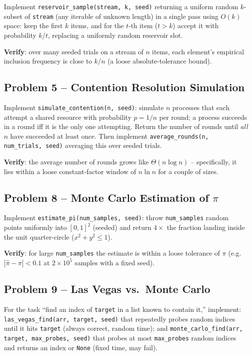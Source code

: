 \documentclass[11pt]{article}
\begin{document}
Implement \texttt{reservoir\_sample(stream, k, seed)} returning a uniform random $k$-subset
of \texttt{stream} (any iterable of unknown length) in a single pass using $O(k)$ space:
keep the first $k$ items, and for the $t$-th item ($t>k$) accept it with probability $k/t$,
replacing a uniformly random reservoir slot.

\textbf{Verify}: over many seeded trials on a stream of $n$ items, each element's empirical
inclusion frequency is close to $k/n$ (a loose absolute-tolerance bound).

\subsection*{Problem 5 -- Contention Resolution Simulation}

Implement \texttt{simulate\_contention(n, seed)}: simulate $n$ processes that each attempt a
shared resource with probability $p = 1/n$ per round; a process succeeds in a round iff it
is the only one attempting. Return the number of rounds until \emph{all} $n$ have succeeded
at least once. Then implement \texttt{average\_rounds(n, num\_trials, seed)} averaging this
over seeded trials.

\textbf{Verify}: the average number of rounds grows like $\Theta(n\log n)$ -- specifically,
it lies within a loose constant-factor window of $n\ln n$ for a couple of sizes.

\subsection*{Problem 8 -- Monte Carlo Estimation of $\pi$}

Implement \texttt{estimate\_pi(num\_samples, seed)}: throw \texttt{num\_samples} random
points uniformly into $[0,1]^2$ (seeded) and return $4\times$ the fraction landing inside
the unit quarter-circle ($x^2 + y^2 \le 1$).

\textbf{Verify}: for large \texttt{num\_samples} the estimate is within a loose tolerance of
$\pi$ (e.g.\ $|\hat\pi - \pi| < 0.1$ at $2\times 10^5$ samples with a fixed seed).

\subsection*{Problem 9 -- Las Vegas vs.\ Monte Carlo}

For the task ``find an index of \texttt{target} in a list known to contain it,'' implement:
\texttt{las\_vegas\_find(arr, target, seed)} that repeatedly probes random indices until it
hits \texttt{target} (always correct, random time); and \texttt{monte\_carlo\_find(arr,
target, max\_probes, seed)} that probes at most \texttt{max\_probes} random indices and
returns an index or \texttt{None} (fixed time, may fail).
\end{document}
